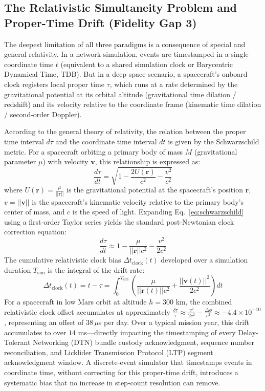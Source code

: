 \documentclass[a4paper,fleqn]{cas-sc}
\begin{document}
\subsection{The Relativistic Simultaneity Problem and Proper-Time Drift (Fidelity Gap 3)}
The deepest limitation of all three paradigms is a consequence of special and general relativity. In a network simulation, events are timestamped in a single coordinate time $t$ (equivalent to a shared simulation clock or Barycentric Dynamical Time, TDB). But in a deep space scenario, a spacecraft's onboard clock registers local proper time $\tau$, which runs at a rate determined by the gravitational potential at its orbital altitude (gravitational time dilation / redshift) and its velocity relative to the coordinate frame (kinematic time dilation / second-order Doppler). 

According to the general theory of relativity, the relation between the proper time interval $d\tau$ and the coordinate time interval $dt$ is given by the Schwarzschild metric. For a spacecraft orbiting a primary body of mass $M$ (gravitational parameter $\mu$) with velocity $\mathbf{v}$, this relationship is expressed as:
\begin{equation}
    \frac{d\tau}{dt} = \sqrt{1 - \frac{2U(\mathbf{r})}{c^2} - \frac{v^2}{c^2}}
    \label{eq:schwarzschild}
\end{equation}
where $U(\mathbf{r}) = \frac{\mu}{||\mathbf{r}||}$ is the gravitational potential at the spacecraft's position $\mathbf{r}$, $v = ||\mathbf{v}||$ is the spacecraft's kinematic velocity relative to the primary body's center of mass, and $c$ is the speed of light.
Expanding Eq.~\eqref{eq:schwarzschild} using a first-order Taylor series yields the standard post-Newtonian clock correction equation:
\begin{equation}
    \frac{d\tau}{dt} \approx 1 - \frac{\mu}{||\mathbf{r}|| c^2} - \frac{v^2}{2 c^2}
    \label{eq:post_newtonian}
\end{equation}
The cumulative relativistic clock bias $\Delta t_{\text{clock}}(t)$ developed over a simulation duration $T_{\text{sim}}$ is the integral of the drift rate:
\begin{equation}
    \Delta t_{\text{clock}}(t) = t - \tau = \int_{0}^{T_{\text{sim}}} \left( \frac{\mu}{||\mathbf{r}(t)|| c^2} + \frac{||\mathbf{v}(t)||^2}{2 c^2} \right) dt
    \label{eq:clock_bias}
\end{equation}
For a spacecraft in low Mars orbit at altitude $h = 300$ km, the combined relativistic clock offset accumulates at approximately $\frac{\delta \tau}{\tau} \approx \frac{v^2}{2c^2} - \frac{\Delta \phi}{c^2} \approx -4.4 \times 10^{-10}$, representing an offset of $38\,\mu$s per day. Over a typical mission year, this drift accumulates to over $14$ ms---directly impacting the timestamping of every Delay-Tolerant Networking (DTN) bundle custody acknowledgment, sequence number reconciliation, and Licklider Transmission Protocol (LTP) segment acknowledgment window. A discrete-event simulator that timestamps events in coordinate time, without correcting for this proper-time drift, introduces a systematic bias that no increase in step-count resolution can remove.
\end{document}
